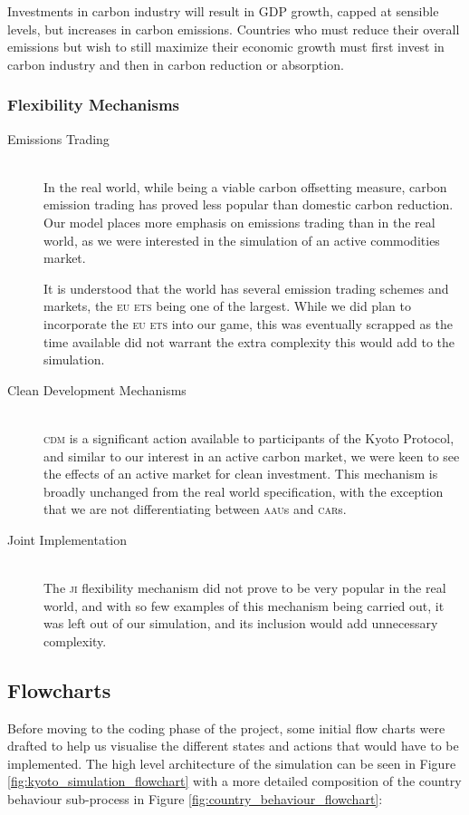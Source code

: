 \begin{description}
Investments in carbon industry will result in GDP growth, capped at sensible levels, but increases in carbon emissions. Countries who must reduce their overall emissions but wish to still maximize their economic growth must first invest in carbon industry and then in carbon reduction or absorption.
\end{description}

\subsubsection{Flexibility Mechanisms}
\begin{description}
	\item [Emissions Trading] \hfill \\ In the real world, while being a viable carbon offsetting measure, carbon emission trading has proved less popular than domestic carbon reduction. Our model places more emphasis on emissions trading than in the real world, as we were interested in the simulation of an active commodities market.

It is understood that the world has several emission trading schemes and markets, the \textsc{eu ets} being one of the largest. While we did plan to incorporate the \textsc{eu ets} into our game, this was eventually scrapped as the time available did not warrant the extra complexity this would add to the simulation.
	\item [Clean Development Mechanisms] \hfill \\ \textsc{cdm} is a significant action available to participants of the Kyoto Protocol, and similar to our interest in an active carbon market, we were keen to see the effects of an active market for clean investment. This mechanism is broadly unchanged from the real world specification, with the exception that we are not differentiating between \textsc{aau}s and \textsc{car}s.
	\item [Joint Implementation] \hfill \\ The \textsc{ji} flexibility mechanism did not prove to be very popular in the real world, and with so few examples of this mechanism being carried out, it was left out of our simulation, and its inclusion would add unnecessary complexity.
\end{description}	
	
\subsection{Flowcharts}
Before moving to the coding phase of the project, some initial flow charts were drafted to help us visualise the different states and actions that would have to be implemented. The high level architecture of the simulation can be seen in Figure \ref{fig:kyoto_simulation_flowchart} with a more detailed composition of the country behaviour sub-process in Figure \ref{fig:country_behaviour_flowchart}:

